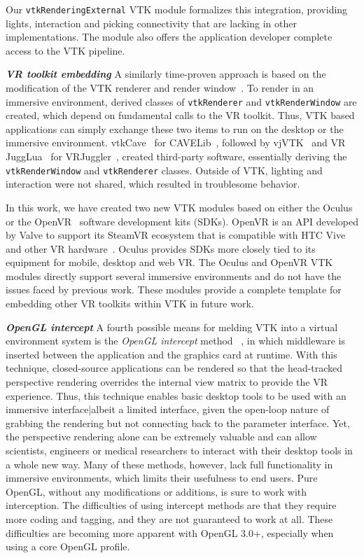 Our \texttt{vtkRenderingExternal} VTK module formalizes this integration, providing lights, interaction and picking connectivity that are lacking in other implementations. The module also offers the application developer complete access to the VTK pipeline.

\textbf{\textit{VR toolkit embedding}} A similarly time-proven approach is based on the modification of the VTK renderer and render window~\cite{van2000vista, Hannema:2001, Shamonin02vtkcave, Belleman:2003}. 
To render in an immersive environment, derived classes of
\texttt{vtkRenderer} and \texttt{vtkRenderWindow} are created, which depend on fundamental calls to the VR toolkit.
Thus, VTK based applications can simply exchange these two items to run on the desktop or the immersive environment.
vtkCave~\cite{Tufo:1999} for  CAVELib~\cite{CAVELib:2016}, followed by
vjVTK~\cite{Blom:2006} and VR JuggLua~\cite{Pavlik:2012} for
VRJuggler~\cite{Bierbaum:2001}, created third-party software, essentially
deriving the \texttt{vtkRenderWindow} and \texttt{vtkRenderer} classes. Outside of VTK, lighting and interaction were not shared, which resulted in troublesome behavior.

In this work, we have created two new VTK modules based on either the Oculus~\cite{Oculus:2016} or the OpenVR~\cite{OpenVR:2016} software development kits (SDKs).
OpenVR is an API developed by Valve to support its SteamVR ecosystem that is compatible with HTC Vive and other VR hardware~\cite{Road2VR:2015}. Oculus provides SDKs more closely tied to its equipment for mobile, desktop and web VR. The Oculus and OpenVR VTK modules directly support several immersive environments
and do not have the issues faced by previous work. These modules provide a complete template
for embedding other VR toolkits within VTK in future work.

\textit{\textbf{OpenGL intercept}}
A fourth possible means for melding VTK into a virtual environment system
is the \textit{OpenGL intercept} method
~\cite{Humphreys:2001,Humphreys:2002,Zielinski:2014,TechViz:2016,Conduit:2016}, in which middleware is inserted between the application and the graphics card at runtime.
With this technique, closed-source applications can be rendered so that
the head-tracked perspective rendering overrides the internal view matrix
to provide the VR experience.
Thus, this technique enables basic desktop tools to be used with an
immersive interface|albeit a limited interface, given the open-loop nature of
grabbing the rendering but not connecting back to the parameter interface.
Yet, the perspective rendering alone can be extremely valuable and can allow
scientists, engineers or medical researchers to interact with their desktop
tools in a whole new way. Many of these methods, however, lack full functionality in immersive environments, which limits their usefulness to end users.
Pure OpenGL, without any modifications or additions, is sure to work with interception.
The difficulties of using intercept methods are that they require more coding
and tagging, and they are not guaranteed to work at all. These difficulties are becoming
more apparent with OpenGL 3.0+, especially when using a core OpenGL profile.

